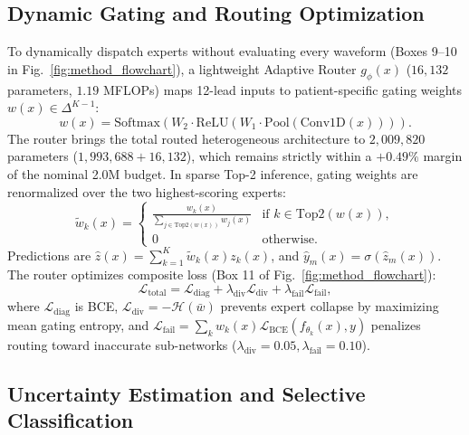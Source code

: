 \documentclass{ICIC2026}
\begin{document}
\subsection{Dynamic Gating and Routing Optimization}
\label{subsec:routing}

To dynamically dispatch experts without evaluating every waveform (Boxes 9--10 in Fig.~\ref{fig:method_flowchart}), a lightweight Adaptive Router $g_\phi(x)$ ($16,132$ parameters, $1.19$ MFLOPs) maps 12-lead inputs to patient-specific gating weights $w(x) \in \Delta^{K-1}$:
\begin{equation}
w(x) = \text{Softmax}\left(W_2 \cdot \text{ReLU}(W_1 \cdot \text{Pool}(\text{Conv1D}(x)))\right).
\label{eq:gating_softmax}
\end{equation}
The router brings the total routed heterogeneous architecture to $2,009,820$ parameters ($1,993,688 + 16,132$), which remains strictly within a $+0.49\%$ margin of the nominal 2.0M budget. In sparse Top-2 inference, gating weights are renormalized over the two highest-scoring experts:
\begin{equation}
\tilde{w}_k(x) = \begin{cases} 
\frac{w_k(x)}{\sum_{j \in \text{Top2}(w(x))} w_j(x)} & \text{if } k \in \text{Top2}(w(x)), \\
0 & \text{otherwise}.
\end{cases}
\label{eq:top2_sparsity}
\end{equation}
Predictions are $\hat{z}(x) = \sum_{k=1}^K \tilde{w}_k(x) z_k(x)$, and $\hat{y}_m(x) = \sigma(\hat{z}_m(x))$. The router optimizes composite loss (Box 11 of Fig.~\ref{fig:method_flowchart}):
\begin{equation}
\mathcal{L}_{\text{total}} = \mathcal{L}_{\text{diag}} + \lambda_{\text{div}} \mathcal{L}_{\text{div}} + \lambda_{\text{fail}} \mathcal{L}_{\text{fail}},
\label{eq:composite_loss}
\end{equation}
where $\mathcal{L}_{\text{diag}}$ is BCE, $\mathcal{L}_{\text{div}} = -\mathcal{H}(\bar{w})$ prevents expert collapse by maximizing mean gating entropy, and $\mathcal{L}_{\text{fail}} = \sum_k w_k(x) \mathcal{L}_{\text{BCE}}(f_{\theta_k}(x), y)$ penalizes routing toward inaccurate sub-networks ($\lambda_{\text{div}} = 0.05, \lambda_{\text{fail}} = 0.10$).

\subsection{Uncertainty Estimation and Selective Classification}
\label{subsec:uncertainty}
\end{document}
